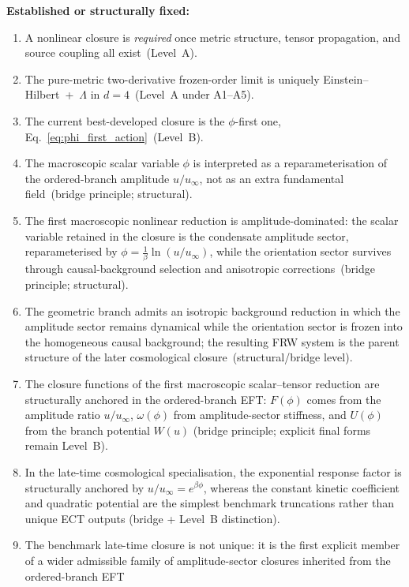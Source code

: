 \documentclass[11pt,a4paper]{article}
\numberwithin{equation}{section}
\begin{document}
\textbf{Established or structurally fixed:}
\begin{enumerate}[label=(\roman*)]
  \item A nonlinear closure is \emph{required} once metric structure,
    tensor propagation, and source coupling all exist~(Level~A).
  \item The pure-metric two-derivative frozen-order limit is uniquely
    Einstein--Hilbert~+~$\Lambda$ in $d=4$~(Level~A under A1--A5).
  \item The current best-developed closure is the $\phi$-first one,
    Eq.~\eqref{eq:phi_first_action}~(Level~B).
  \item The macroscopic scalar variable $\phi$ is interpreted as a
    reparameterisation of the ordered-branch amplitude $u/u_\infty$,
    not as an extra fundamental field~(bridge principle; structural).
  \item The first macroscopic nonlinear reduction is amplitude-dominated:
    the scalar variable retained in the closure is the condensate
    amplitude sector, reparameterised by $\phi=\frac{1}{\beta}\ln(u/u_\infty)$,
    while the orientation sector survives through causal-background
    selection and anisotropic corrections~(bridge principle; structural).
  \item The geometric branch admits an isotropic background reduction in
    which the amplitude sector remains dynamical while the orientation
    sector is frozen into the homogeneous causal background; the
    resulting FRW system is the parent structure of the later
    cosmological closure~(structural/bridge level).
  \item The closure functions of the first macroscopic scalar--tensor
    reduction are structurally anchored in the ordered-branch EFT:
    $F(\phi)$ comes from the amplitude ratio $u/u_\infty$,
    $\omega(\phi)$ from amplitude-sector stiffness,
    and $U(\phi)$ from the branch potential $W(u)$
    (bridge principle; explicit final forms remain Level~B).
  \item In the late-time cosmological specialisation, the exponential
    response factor is structurally anchored by $u/u_\infty=e^{\beta\phi}$,
    whereas the constant kinetic coefficient and quadratic potential are
    the simplest benchmark truncations rather than unique ECT outputs
    (bridge + Level~B distinction).
  \item The benchmark late-time closure is not unique: it is the first
    explicit member of a wider admissible family of amplitude-sector
    closures inherited from the ordered-branch EFT

\end{enumerate}
\end{document}
